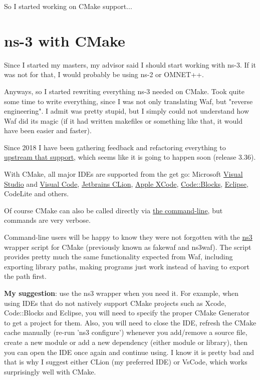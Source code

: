\documentclass{article}
\begin{document}
    So I started working on CMake support...

\section*{ns-3 with CMake}
    Since I started my masters, my advisor said I should start working with ns-3. If it was not for that, I would
    probably be using ns-2 or OMNET++.

    Anyways, so I started rewriting everything ns-3 needed on CMake. Took quite some time to write everything, since
    I was not only translating Waf, but "reverse engineering". I admit was pretty stupid, but I simply could not
    understand how Waf did its magic (if it had written makefiles or something like that, it would have been easier
    and faster).

    Since 2018 I have been gathering feedback and refactoring everything to
    \href{https://gitlab.com/nsnam/ns-3-dev/-/merge_requests/460}{upstream that support}, which seems like
    it is going to happen soon (release 3.36).

    With CMake, all major IDEs are supported from the get go: Microsoft
    \href{https://gabrielcarvfer.github.io/NS3/installation/visualstudio}{Visual Studio} and
    \href{https://gabrielcarvfer.github.io/NS3/installation/visualcode}{Visual Code},
    \href{https://gabrielcarvfer.github.io/NS3/installation/clion}{Jetbrains CLion},
    \href{https://gabrielcarvfer.github.io/NS3/installation/xcode}{Apple XCode},
    \href{https://gabrielcarvfer.github.io/NS3/installation/codeblocks}{Code::Blocks},
    \href{https://gabrielcarvfer.github.io/NS3/installation/eclipse}{Eclipse},
    CodeLite and others.

    Of course CMake can also be called directly via
    \href{https://gabrielcarvfer.github.io/NS3/installation/terminal}{the command-line}, but commands are very verbose.

    Command-line users will be happy to know they were not forgotten with the
    \href{https://gabrielcarvfer.github.io/NS3/installation/ns3waf}{ns3} wrapper script for CMake
    (previously known as fakewaf and ns3waf).
    The script provides pretty much the same functionality expected from Waf, including exporting library paths, making
    programs just work instead of having to export the path first.

    \textbf{My suggestion}: use the ns3 wrapper when you need it. For example, when using IDEs that do not natively
    support CMake projects such as Xcode, Code::Blocks and Eclipse, you will need to specify the proper CMake
    Generator to get a project for them. Also, you will need to close the IDE, refresh the CMake cache manually
    (re-run 'ns3 configure') whenever you add/remove a source file, create a new module or add a new dependency
    (either module or library), then you can open the IDE once again and continue using. I know it is pretty bad and
    that is why I suggest either CLion (my preferred IDE) or VsCode, which works surprisingly well with CMake.
\end{document}
